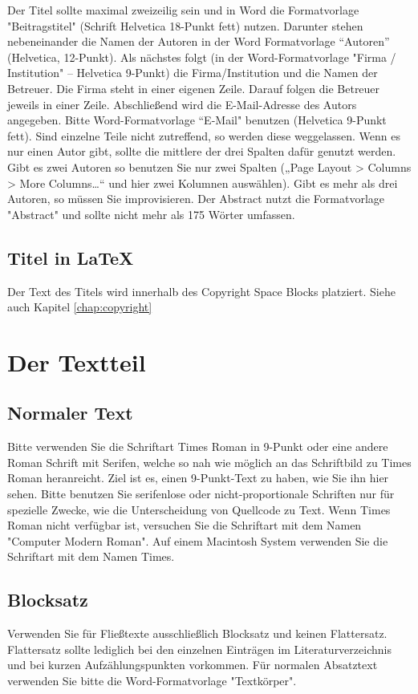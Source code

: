 {Der Titel sollte maximal zweizeilig sein und in Word die Formatvorlage "Beitragstitel" (Schrift Helvetica 18-Punkt fett) nutzen. 
Darunter stehen nebeneinander die Namen der Autoren in der Word Formatvorlage “Autoren” (Helvetica, 12-Punkt). Als nächstes folgt (in der Word-Formatvorlage "Firma / Institution" – Helvetica 9-Punkt) die Firma/Institution und die Namen der Betreuer. Die Firma steht in einer eigenen Zeile. Darauf folgen die Betreuer jeweils in einer Zeile. Abschließend wird die E-Mail-Adresse des Autors angegeben. Bitte Word-Formatvorlage “E-Mail" benutzen (Helvetica 9-Punkt fett).
Sind einzelne Teile nicht zutreffend, so werden diese weggelassen.
Wenn es nur einen Autor gibt, sollte die mittlere der drei Spalten dafür genutzt werden. Gibt es zwei Autoren so benutzen Sie nur zwei Spalten („Page Layout > Columns > More Columns…“ und hier zwei Kolumnen auswählen). Gibt es mehr als drei Autoren, so müssen Sie improvisieren.
Der Abstract nutzt die Formatvorlage "Abstract" und sollte nicht mehr als 175 Wörter umfassen.


\subsection{Titel in LaTeX}

Der Text des Titels wird innerhalb des Copyright Space Blocks platziert. Siehe auch Kapitel \ref{chap:copyright}

\section{Der Textteil}
\subsection{Normaler Text}
Bitte verwenden Sie die Schriftart Times Roman in 9-Punkt oder eine andere Roman Schrift mit Serifen, welche so nah wie möglich an das Schriftbild zu Times Roman
heranreicht. Ziel ist es, einen 9-Punkt-Text zu haben, wie Sie ihn hier sehen.
Bitte benutzen Sie serifenlose oder nicht-proportionale Schriften nur für spezielle Zwecke, wie die Unterscheidung von Quellcode zu Text.
Wenn Times Roman nicht verfügbar ist, versuchen Sie die Schriftart mit dem Namen "Computer Modern Roman". Auf einem Macintosh System verwenden Sie die Schriftart mit dem Namen Times.

\subsection{Blocksatz}
Verwenden Sie für Fließtexte ausschließlich Blocksatz und keinen Flattersatz. Flattersatz sollte lediglich bei den einzelnen Einträgen im Literaturverzeichnis und bei kurzen Aufzählungspunkten vorkommen.
Für normalen Absatztext verwenden Sie bitte die Word-Formatvorlage "Textkörper".

}
